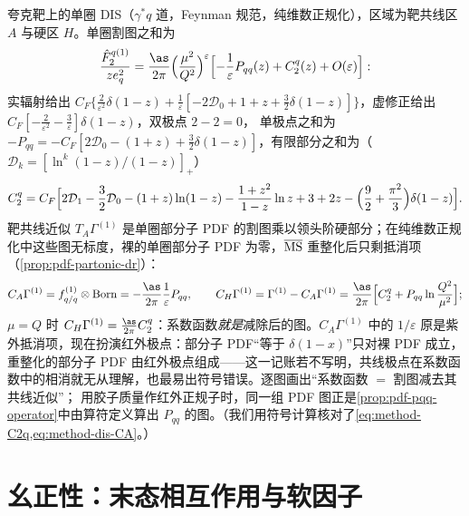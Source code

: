 \begin{example}\label{ex:method-dis-oneloop}
夸克靶上的单圈 DIS（$\gamma^*q$ 道，Feynman 规范，纯维数正规化），区域为靶共线区 $A$ 与硬区 $H$。单圈割图之和为
\begin{equation}\label{eq:method-dis-gamma1}
\frac{\hat F_2^{q(1)}}{ze_q^2}=\frac{\as}{2\pi}\Bigl(\frac{\mu^2}{Q^2}\Bigr)^{\varepsilon}\Bigl[-\frac1\varepsilon P_{qq}(z)+C_2^q(z)+O(\varepsilon)\Bigr] :
\end{equation}
实辐射给出 $C_F\{\frac2{\varepsilon^2}\delta(1-z)+\frac1\varepsilon[-2\mathcal D_0+1+z+\frac32\delta(1-z)]\}$，虚修正给出 $C_F[-\frac2{\varepsilon^2}-\frac3\varepsilon]\delta(1-z)$，双极点 $2-2=0$，
单极点之和为 $-P_{qq}=-C_F[2\mathcal D_0-(1+z)+\frac32\delta(1-z)]$，有限部分之和为（$\mathcal D_k=[\ln^k(1-z)/(1-z)]_+$）
\begin{equation}\label{eq:method-C2q}
C_2^q=C_F\Bigl[2\mathcal D_1-\frac32\mathcal D_0-(1+z)\ln(1-z)-\frac{1+z^2}{1-z}\ln z+3+2z-\Bigl(\frac92+\frac{\pi^2}3\Bigr)\delta(1-z)\Bigr] .
\end{equation}
靶共线近似 $T_A\Gamma^{(1)}$ 是单圈部分子 PDF 的割图乘以领头阶硬部分；在纯维数正规化中这些图无标度，裸的单圈部分子 PDF 为零，$\overline{\rm MS}$ 重整化后只剩抵消项（\cref{prop:pdf-partonic-dr}）：
\begin{equation}\label{eq:method-dis-CA}
C_A\Gamma^{(1)}=f^{(1)}_{q/q}\otimes{\rm Born}=-\frac{\as}{2\pi}\frac1\varepsilon P_{qq},\qquad
C_H\Gamma^{(1)}=\Gamma^{(1)}-C_A\Gamma^{(1)}=\frac{\as}{2\pi}\Bigl[C_2^q+P_{qq}\ln\frac{Q^2}{\mu^2}\Bigr] ;
\end{equation}
$\mu=Q$ 时 $C_H\Gamma^{(1)}=\frac{\as}{2\pi}C_2^q$：系数函数\emph{就是}减除后的图。$C_A\Gamma^{(1)}$ 中的 $1/\varepsilon$ 原是紫外抵消项，现在扮演红外极点：部分子 PDF“等于 $\delta(1-x)$”只对裸 PDF 成立，
重整化的部分子 PDF 由红外极点组成——这一记账若不写明，共线极点在系数函数中的相消就无从理解，也最易出符号错误。逐图画出“系数函数 $=$ 割图减去其共线近似”；
用胶子质量作红外正规子时，同一组 PDF 图正是\cref{prop:pdf-pqq-operator}中由算符定义算出 $P_{qq}$ 的图。（我们用符号计算核对了\cref{eq:method-C2q,eq:method-dis-CA}。）%
\end{example}

\section{幺正性：末态相互作用与软因子}\label{sec:method-unitarity}

